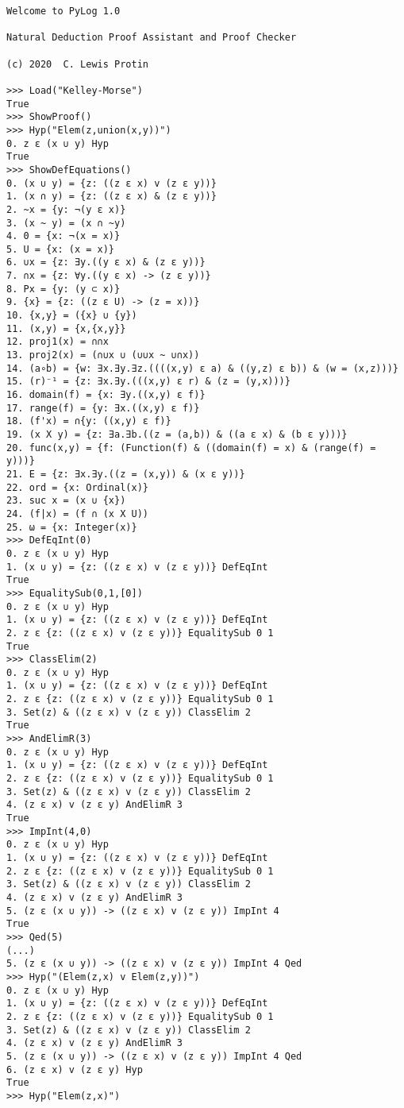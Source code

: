 \documentclass[a4paper,12pt,leqno]{article}
\numberwithin{equation}{section}
\begin{document}
\begin{verbatim}
Welcome to PyLog 1.0

Natural Deduction Proof Assistant and Proof Checker

(c) 2020  C. Lewis Protin

>>> Load("Kelley-Morse")
True
>>> ShowProof()
>>> Hyp("Elem(z,union(x,y))")
0. z ε (x ∪ y) Hyp 
True
>>> ShowDefEquations()
0. (x ∪ y) = {z: ((z ε x) v (z ε y))} 
1. (x ∩ y) = {z: ((z ε x) & (z ε y))} 
2. ~x = {y: ¬(y ε x)} 
3. (x ~ y) = (x ∩ ~y) 
4. 0 = {x: ¬(x = x)} 
5. U = {x: (x = x)} 
6. ∪x = {z: ∃y.((y ε x) & (z ε y))} 
7. ∩x = {z: ∀y.((y ε x) -> (z ε y))} 
8. Px = {y: (y ⊂ x)} 
9. {x} = {z: ((z ε U) -> (z = x))} 
10. {x,y} = ({x} ∪ {y}) 
11. (x,y) = {x,{x,y}} 
12. proj1(x) = ∩∩x 
13. proj2(x) = (∩∪x ∪ (∪∪x ~ ∪∩x)) 
14. (a∘b) = {w: ∃x.∃y.∃z.((((x,y) ε a) & ((y,z) ε b)) & (w = (x,z)))} 
15. (r)⁻¹ = {z: ∃x.∃y.(((x,y) ε r) & (z = (y,x)))} 
16. domain(f) = {x: ∃y.((x,y) ε f)} 
17. range(f) = {y: ∃x.((x,y) ε f)} 
18. (f'x) = ∩{y: ((x,y) ε f)} 
19. (x X y) = {z: ∃a.∃b.((z = (a,b)) & ((a ε x) & (b ε y)))} 
20. func(x,y) = {f: (Function(f) & ((domain(f) = x) & (range(f) = y)))} 
21. E = {z: ∃x.∃y.((z = (x,y)) & (x ε y))} 
22. ord = {x: Ordinal(x)} 
23. suc x = (x ∪ {x}) 
24. (f|x) = (f ∩ (x X U)) 
25. ω = {x: Integer(x)} 
>>> DefEqInt(0)
0. z ε (x ∪ y) Hyp 
1. (x ∪ y) = {z: ((z ε x) v (z ε y))} DefEqInt 
True
>>> EqualitySub(0,1,[0])
0. z ε (x ∪ y) Hyp 
1. (x ∪ y) = {z: ((z ε x) v (z ε y))} DefEqInt 
2. z ε {z: ((z ε x) v (z ε y))} EqualitySub 0 1
True
>>> ClassElim(2)
0. z ε (x ∪ y) Hyp 
1. (x ∪ y) = {z: ((z ε x) v (z ε y))} DefEqInt 
2. z ε {z: ((z ε x) v (z ε y))} EqualitySub 0 1
3. Set(z) & ((z ε x) v (z ε y)) ClassElim 2
True
>>> AndElimR(3)
0. z ε (x ∪ y) Hyp 
1. (x ∪ y) = {z: ((z ε x) v (z ε y))} DefEqInt 
2. z ε {z: ((z ε x) v (z ε y))} EqualitySub 0 1
3. Set(z) & ((z ε x) v (z ε y)) ClassElim 2
4. (z ε x) v (z ε y) AndElimR 3
True
>>> ImpInt(4,0)
0. z ε (x ∪ y) Hyp 
1. (x ∪ y) = {z: ((z ε x) v (z ε y))} DefEqInt 
2. z ε {z: ((z ε x) v (z ε y))} EqualitySub 0 1
3. Set(z) & ((z ε x) v (z ε y)) ClassElim 2
4. (z ε x) v (z ε y) AndElimR 3
5. (z ε (x ∪ y)) -> ((z ε x) v (z ε y)) ImpInt 4
True
>>> Qed(5)
(...)
5. (z ε (x ∪ y)) -> ((z ε x) v (z ε y)) ImpInt 4 Qed
>>> Hyp("(Elem(z,x) v Elem(z,y))")
0. z ε (x ∪ y) Hyp 
1. (x ∪ y) = {z: ((z ε x) v (z ε y))} DefEqInt 
2. z ε {z: ((z ε x) v (z ε y))} EqualitySub 0 1
3. Set(z) & ((z ε x) v (z ε y)) ClassElim 2
4. (z ε x) v (z ε y) AndElimR 3
5. (z ε (x ∪ y)) -> ((z ε x) v (z ε y)) ImpInt 4 Qed
6. (z ε x) v (z ε y) Hyp 
True
>>> Hyp("Elem(z,x)")

\end{verbatim}
\end{document}
